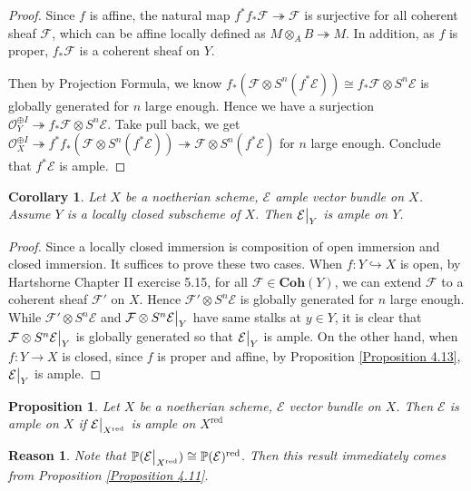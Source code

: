 \documentclass{ctexart}
\newtheorem{proposition}{Proposition}[section]
\newtheorem{reason}{Reason}[section]
\newtheorem{corollary}{Corollary}[section]
\newcommand{\reduction}{\operatorname{red}}
\newcommand{\coherent}{\mathbf{Coh}}
\begin{document}
\begin{proof}
    Since $f$ is affine, the natural map $f^{\ast}f_{\ast}\mathcal{F} \twoheadrightarrow \mathcal{F}$ is surjective for all coherent sheaf $\mathcal{F}$,
    which can be affine locally defined as $M \otimes_{A} B \twoheadrightarrow M$.
    In addition, as $f$ is proper, $f_{\ast}\mathcal{F}$ is a coherent sheaf on $Y$.
    \par
    Then by Projection Formula, we know $f_{\ast}(\mathcal{F} \otimes S^{n}(f^{\ast}\mathcal{E})) \cong f_{\ast}\mathcal{F} \otimes S^{n}\mathcal{E}$ is globally generated for $n$ large enough.
    Hence we have a surjection $\mathcal{O}_{Y}^{\oplus I} \twoheadrightarrow f_{\ast}\mathcal{F} \otimes S^{n}\mathcal{E}$.
    Take pull back, we get $\mathcal{O}_{X}^{\oplus I} \twoheadrightarrow f^{\ast}f_{\ast}(\mathcal{F} \otimes S^{n}(f^{\ast}\mathcal{E})) \twoheadrightarrow \mathcal{F} \otimes S^{n}(f^{\ast}\mathcal{E})$ for $n$ large enough.
    Conclude that $f^{\ast}\mathcal{E}$ is ample.
\end{proof}
\begin{corollary}
    Let $X$ be a noetherian scheme, $\mathcal{E}$ ample vector bundle on $X$.
    Assume $Y$ is a locally closed subscheme of $X$.
    Then $\mathcal{E}\big{|}_{Y}$ is ample on $Y$.
    \label{Corollary 4.8}
\end{corollary}
\begin{proof}
    Since a locally closed immersion is composition of open immersion and closed immersion.
    It suffices to prove these two cases.
    When $f: Y \hookrightarrow X$ is open, by Hartshorne Chapter II exercise 5.15,
    for all $\mathcal{F}\in \coherent (Y)$, we can extend $\mathcal{F}$ to a coherent sheaf $\mathcal{F}'$ on $X$.
    Hence $\mathcal{F}' \otimes S^{n}\mathcal{E}$ is globally generated for $n$ large enough.
    While $\mathcal{F}' \otimes S^{n}\mathcal{E}$ and $\mathcal{F} \otimes S^{n}\mathcal{E}\big{|}_{Y}$ have same stalks at $y\in Y$,
    it is clear that $\mathcal{F} \otimes S^{n}\mathcal{E}\big{|}_{Y}$ is globally generated so that $\mathcal{E}\big{|}_{Y}$ is ample.
    On the other hand, when $f: Y \rightarrow X$ is closed, since $f$ is proper and affine, 
    by Proposition \ref{Proposition 4.13}, $\mathcal{E}\big{|}_{Y}$ is ample.
\end{proof}
\begin{proposition}
    Let $X$ be a noetherian scheme, $\mathcal{E}$ vector bundle on $X$.
    Then $\mathcal{E}$ is ample on $X$ if $\mathcal{E}\big{|}_{X^{\reduction}}$ is ample on $X^{\reduction}$
    \label{Proposition 4.14}
\end{proposition}
\begin{reason}
    Note that $\mathbb{P}(\mathcal{E}\big{|}_{X^{\reduction}}) \cong \mathbb{P}(\mathcal{E})^{\reduction}$.
    Then this result immediately comes from Proposition \ref{Proposition 4.11}.
\end{reason}
\end{document}
